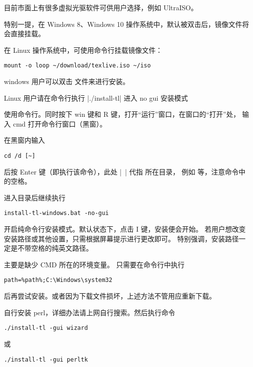 目前市面上有很多虚拟光驱软件可供用户选择，例如 UltraISO。

特别一提，在 Windows 8、Windows 10
操作系统中，默认被双击后，镜像文件将会直接挂载。

在 Linux 操作系统中，可使用命令行挂载镜像文件：
\begin{verbatim}
mount -o loop ~/download/texlive.iso ~/iso
\end{verbatim}



windows 用户可以双击  文件来进行安装。

Linux 用户请在命令行执行 |./install-tl| 进入 no gui 安装模式



使用命令行。同时按下 win 键和 R 键，打开“运行”窗口，在窗口的“打开”处，
输入 cmd 打开命令行窗口（黑窗）。

在黑窗内输入
\begin{verbatim}
cd /d [~]
\end{verbatim}

后按 Enter 键（即执行该命令），此处 |~| 代指  所在目录，
例如  等，注意命令中的空格。

进入目录后继续执行
\begin{verbatim}
install-tl-windows.bat -no-gui
\end{verbatim}

开启纯命令行安装模式。默认状态下，点击 I 键，安装便会开始。
若用户想改变安装路径或其他设置，只需根据屏幕提示进行更改即可。
特别强调，安装路径一定是不带空格的纯英文路径。



主要是缺少 CMD 所在的环境变量。 只需要在命令行中执行
\begin{verbatim}
path=%path%;C:\Windows\system32
\end{verbatim}
后再尝试安装。或者因为下载文件损坏，上述方法不管用应重新下载。



自行安装 perl，详细办法请上网自行搜索。然后执行命令
\begin{verbatim}
./install-tl -gui wizard
\end{verbatim}
或
\begin{verbatim}
./install-tl -gui perltk
\end{verbatim}


